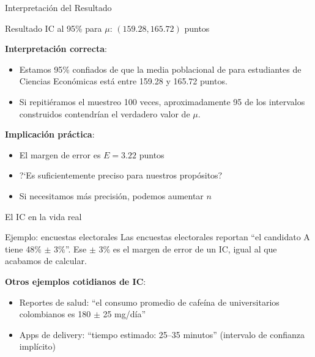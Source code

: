 \documentclass[aspectratio=169, 11pt]{beamer}
\begin{document}
\begin{frame}{Interpretaci\'on del Resultado}
\begin{exampleblock}{Resultado}
IC al 95\% para $\mu$: $(159.28, 165.72)$ puntos
\end{exampleblock}

\vspace{0.3cm}
\textbf{Interpretaci\'on correcta}:
\begin{itemize}
  \item Estamos 95\% confiados de que la media poblacional de  para estudiantes de Ciencias Econ\'omicas est\'a entre 159.28 y 165.72 puntos.
  \item Si repiti\'eramos el muestreo 100 veces, aproximadamente 95 de los intervalos construidos contendr\'ian el verdadero valor de $\mu$.
\end{itemize}

\vspace{0.3cm}
\textbf{Implicaci\'on pr\'actica}:
\begin{itemize}
  \item El margen de error es $E = 3.22$ puntos
  \item ?`Es suficientemente preciso para nuestros prop\'ositos?
  \item Si necesitamos m\'as precisi\'on, podemos aumentar $n$
\end{itemize}
\end{frame}

\begin{frame}{El IC en la vida real}
\begin{alertblock}{Ejemplo: encuestas electorales}
Las encuestas electorales reportan ``el candidato A tiene 48\% $\pm$ 3\%''. Ese $\pm$ 3\% es el margen de error de un IC, igual al que acabamos de calcular.
\end{alertblock}

\vspace{0.5em}
\textbf{Otros ejemplos cotidianos de IC}:
\begin{itemize}
  \item Reportes de salud: ``el consumo promedio de cafe\'ina de universitarios colombianos es 180 $\pm$ 25 mg/d\'ia''
  \item Apps de delivery: ``tiempo estimado: 25--35 minutos'' (intervalo de confianza impl\'icito)
\end{itemize}
\end{frame}

\end{document}
